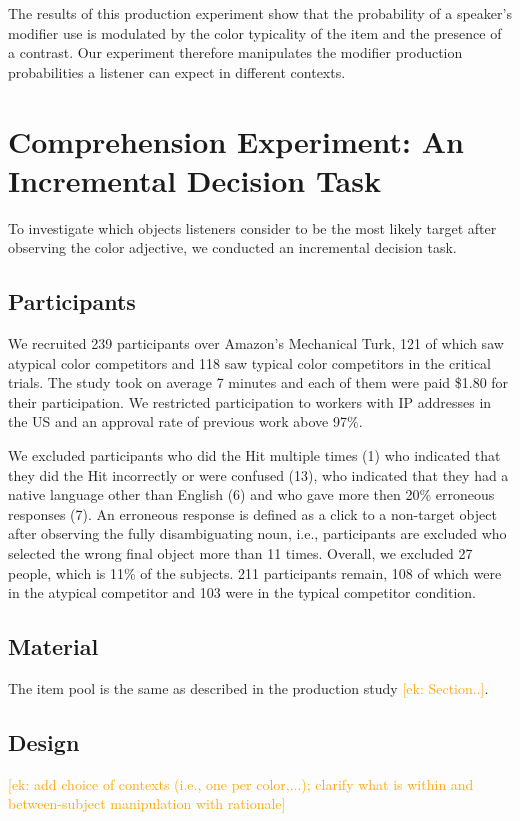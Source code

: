 \documentclass[10pt,letterpaper]{article}
\newcommand{\ek}[1]{\textcolor{Orange}{[ek: #1]}}
\begin{document}
The results of this production experiment show that the probability of a speaker's modifier use is modulated by the color typicality of the item and the presence of a contrast. Our experiment therefore manipulates the modifier production probabilities a listener can expect in different contexts.


\section{Comprehension Experiment: An Incremental Decision Task}
To investigate which objects listeners consider to be the most likely target after observing the color adjective, we conducted an incremental decision task. 


\subsection{Participants}
We recruited 239 participants over Amazon's Mechanical Turk, 121 of which saw atypical color competitors and 118 saw typical color competitors in the critical trials. The study took on average 7 minutes and each of them were paid \$1.80 for their participation. We restricted participation to workers with IP addresses in the US and an approval rate of previous work above 97\%.

We excluded participants who did the Hit multiple times (1) who indicated that they did the Hit incorrectly or were confused (13), who indicated that they had a native language other than English (6) and who gave more then 20\% erroneous responses (7). An erroneous response is defined as a click to a non-target object after observing the fully disambiguating noun, i.e., participants are excluded who selected the wrong final object more than 11 times. Overall, we excluded 27 people, which is 11\% of the subjects. 211 participants remain, 108 of which were in the atypical competitor and 103 were in the typical competitor condition. 


\subsection{Material}
The item pool is the same as described in the production study \ek{Section..}.


\subsection{Design}
\ek{add choice of contexts (i.e., one per color,...); clarify what is within and between-subject manipulation with rationale}
\end{document}

